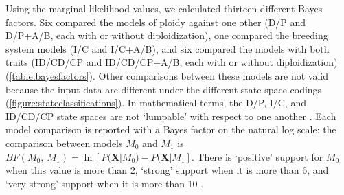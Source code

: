 Using the marginal likelihood values, we calculated thirteen different Bayes factors.
Six compared the models of ploidy against one other (D/P and D/P+A/B, each with or without diploidization), one compared the breeding system models (I/C and I/C+A/B), and six compared the models with both traits (ID/CD/CP and ID/CD/CP+A/B, each with or without diploidization) (\cref{table:bayesfactors}).
%
Other comparisons between these models are not valid because the input data are different under the different state space codings (\cref{figure:stateclassifications}).
In mathematical terms, the D/P, I/C, and ID/CD/CP state spaces are not `lumpable' with respect to one another \citep{tarasov_2019}.
Each model comparison is reported with a Bayes factor on the natural log scale: the comparison between models $M_0$ and $M_1$ is $BF(M_0,\ M_1) = \ln[ P(\mathbf{X} | M_0) - P(\mathbf{X} | M_1]$.
There is `positive' support for $M_0$ when this value is more than 2, `strong' support when it is more than 6, and `very strong' support when it is more than 10 \citep{kass1995}.

